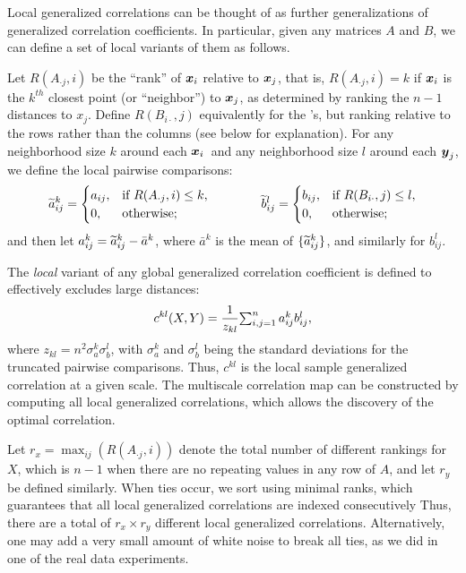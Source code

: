 \documentclass[11pt]{article}
\begin{document}
Local generalized correlations can be thought of as further generalizations of generalized correlation coefficients. In particular, given any matrices $A$ and $B$, we can define a set of local variants of them as follows.  

Let $R(A_{\cdot j},i)$  be the ``rank'' of $\boldsymbol{x}_i$ relative to $\boldsymbol{x}_j$, that is, $R(A_{\cdot j},i)=k$ if $\boldsymbol{x}_i$ is the $k^{th}$ closest point (or ``neighbor'') to $\boldsymbol{x}_j$, as determined by ranking the $n-1$ distances to $x_j$.  
Define $R(B_{i \cdot},j)$ equivalently for the \mby's, but ranking relative to the rows rather than the columns (see below for explanation). 
For any neighborhood size $k$ around each $\boldsymbol{x}_i$~and any neighborhood size $l$ around each $\boldsymbol{y}_j$, we define the local pairwise comparisons:
\begin{equation}
\label{localCoef2}
    \widetilde{a}_{ij}^k=
    \begin{cases}
      a_{ij}, & \text{if } R(A_{\cdot j},i) \leq k, \\    
      0, & \text{otherwise};
    \end{cases} \qquad \qquad
    \widetilde{b}_{ij}^l=
    \begin{cases}
      b_{ij}, & \text{if } R(B_{i \cdot},j) \leq l, \\
      0, & \text{otherwise};
    \end{cases}
\end{equation}
and then let $a^k_{ij}=\widetilde{a}^k_{ij} - \bar{a}^k$, 
where $\bar{a}^k$ is the mean of $\{\widetilde{a}_{ij}^{k}\}$, and similarly for $b^l_{ij}$.

The \emph{local} variant of any global generalized correlation coefficient is defined to effectively excludes large distances:
\begin{equation}
\label{localCoef}
c^{kl}(X,Y)=\dfrac{1}{z_{kl}} {\textstyle \sum_{i,j=1}^n a_{ij}^k b_{ij}^l},
\end{equation}
where $z_{kl}=n^2 \sigma_a^k \sigma_b^l$,  with $\sigma_a^k$ and $\sigma_b^{l}$ being the standard deviations for the truncated pairwise comparisons. Thus, $c^{kl}$ is the local sample generalized correlation at a given scale. The multiscale correlation map can be constructed by computing all local generalized correlations, which allows the discovery of the optimal correlation.

Let $r_x=\max_{ij} (R(A_{\cdot j},i))$ denote the total number of different rankings for $X$, which is $n-1$ when there are no repeating values in any row of $A$, and let $r_y$ be defined similarly.  
When ties occur, we sort using minimal ranks, which guarantees that all local generalized correlations are indexed consecutively
Thus, there are a total of $r_x \times r_y$ different local generalized correlations. 
Alternatively, one may add a very small amount of white noise to break all ties, as we did in one of the real data experiments.
\end{document}
